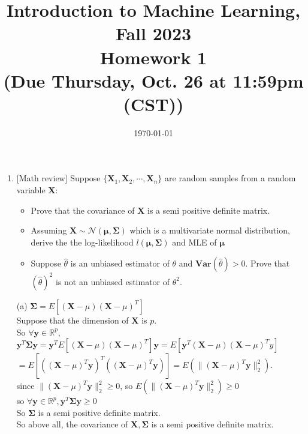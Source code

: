\documentclass[10pt]{article}
\begin{document}
\date{\today}
\title{Introduction to Machine Learning, Fall 2023 \\
	Homework 1\\
	\small (Due Thursday, Oct. 26 at 11:59pm (CST))}
\maketitle
\begin{enumerate}[1.]


	\item {} [Math review] Suppose $\{\mathbf{X}_1, \mathbf{X}_2, \cdots, \mathbf{X}_n\}$ are random samples from a random variable $\mathbf{X}$:
	      \begin{itemize}
		      \item[(a)] Prove that the covariance of $\mathbf{X}$ is a semi positive definite matrix. ~
		      \item[(b)] Assuming $\mathbf{X}\sim \mathcal{N}(\mathbf{\mu},\mathbf{\Sigma})$ which is a multivariate normal distribution, derive the the log-likelihood $\mathit{l}(\mathbf{\mu},\mathbf{\Sigma})$ and MLE of $\mathbf{\mu}$ ~
		      \item[(c)] Suppose $\hat{\theta}$ is an unbiased estimator of $\theta$ and $\mathbf{Var}(\hat{\theta})>0$. Prove that $(\hat{\theta})^2$ is not an unbiased estimator of $\theta^2$. ~
	      \end{itemize}

(a) $\mathbf{\Sigma}=E[(\mathbf{X}-\mu)(\mathbf{X}-\mu)^T]$\\
Suppose that the dimension of $\mathbf{X}$ is $p$.\\
So $\forall \mathbf{y}\in\mathbb{R}^p$,\\
$\mathbf{y}^T\mathbf{\Sigma}\mathbf{y}=\mathbf{y}^TE[(\mathbf{X}-\mu)(\mathbf{X}-\mu)^T]\mathbf{y}=E[\mathbf{y}^T(\mathbf{X}-\mu)(\mathbf{X}-\mu)^Ty]$\\
$=E[((\mathbf{X}-\mu)^T\mathbf{y})^T((\mathbf{X}-\mu)^T\mathbf{y})]=E(\|(\mathbf{X}-\mu)^T\mathbf{y}\|_2^2)$.\\
since $\|(\mathbf{X}-\mu)^T\mathbf{y}\|_2^2\geq0$, so $E(\|(\mathbf{X}-\mu)^T\mathbf{y}\|_2^2)\geq0$\\
so $\forall \mathbf{y}\in\mathbb{R}^p,\mathbf{y}^T\mathbf{\Sigma} \mathbf{y}\geq 0$\\
So $\mathbf{\Sigma}$ is a semi positive definite matrix.\\
So above all, the covariance of $\mathbf{X}, \mathbf{\Sigma}$ is a semi positive definite matrix.\\


\end{enumerate}
\end{document}
